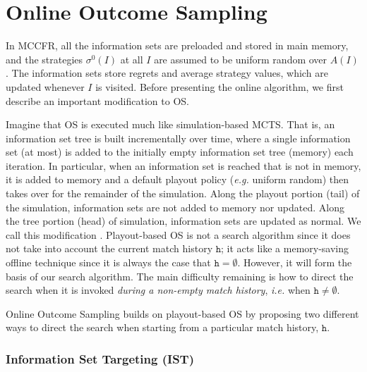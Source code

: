 \documentclass[letterpaper]{article}
\newcommand{\tth}{\mathtt{h}}
\newcommand{\defword}[1]{\textbf{\boldmath{#1}}}
\newcommand{\ie}{{\it i.e.}\xspace}
\newcommand{\eg}{{\it e.g.}\xspace}
\begin{document}

\section{Online Outcome Sampling}


In MCCFR, all the information sets are preloaded and stored in main memory, and
the strategies $\sigma^0(I)$ at all $I$ are assumed to be uniform random over $A(I)$. The information sets store regrets and average strategy 
values, which are updated whenever $I$ is visited. Before presenting the online algorithm, we first describe an important modification to OS.

Imagine that OS is executed much like simulation-based MCTS. That is, an information set tree is built incrementally over 
time, where a single information set (at most) is added to the initially empty information set tree (memory) each iteration. In 
particular, when an information set is reached that is not in memory, it is added to memory and a default playout policy 
(\eg uniform random) then takes over for the remainder of the simulation. Along the playout portion (tail) of the simulation,  
information sets are not added to memory nor updated. Along the tree portion (head) of simulation, information sets are updated as normal. 
We call this modification \defword{playout-based outcome sampling}. 
Playout-based OS is not a search algorithm since it does not take into account the current match history $\tth$; 
it acts like a memory-saving offline technique since it is always the case that $\tth = \emptyset$.
However, it will form the basis of our search algorithm. 
The main difficulty remaining is how to direct the search when it is invoked {\it during a non-empty match history}, 
\ie when $\tth \not= \emptyset$. 

Online Outcome Sampling builds on playout-based OS by proposing two different ways to direct the search when starting from a particular
match history, $\tth$. 

\subsubsection{Information Set Targeting (IST)}
\end{document}
